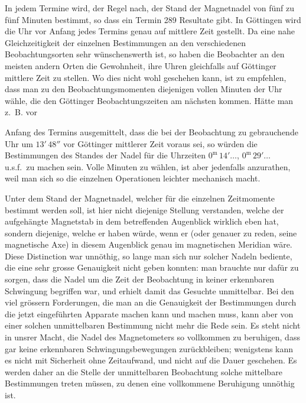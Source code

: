 \documentclass[12pt,a4paper]{article}
\begin{document}
In jedem Termine wird, der Regel nach, der Stand der Magnetnadel von f\"unf zu f\"unf Minuten bestimmt, so dass ein Termin 289 Resultate gibt. In G\"ottingen wird die Uhr vor Anfang jedes Termins genau auf mittlere Zeit gestellt. Da eine nahe Gleichzeitigkeit der einzelnen Bestimmungen an den verschiedenen Beobachtungsorten sehr w\"unschenswerth ist, so haben die Beobachter an den meisten andern Orten die Gewohnheit, ihre Uhren gleichfalls auf G\"ottinger mittlere Zeit zu stellen. Wo dies nicht wohl geschehen kann, ist zu empfehlen, dass man zu den Beobachtungsmomenten diejenigen vollen Minuten der Uhr w\"ahle, die den G\"ottinger Beobachtungszeiten am n\"achsten kommen. H\"atte man z.~B. vor

\newpage
\noindent
Anfang des Termins ausgemittelt, dass die bei der Beobachtung zu gebrauchende Uhr um $13'\,48''$ vor G\"ottinger mittlerer Zeit voraus sei, so w\"urden die Bestimmungen des Standes der Nadel f\"ur die Uhrzeiten $0^{\text{m}}\,14'\ldots$, $0^{\text{m}}\,29'\ldots$ u.s.f.\ zu machen sein. Volle Minuten zu w\"ahlen, ist aber jedenfalls anzurathen, weil man sich so die einzelnen Operationen leichter mechanisch macht.

Unter dem Stand der Magnetnadel, welcher f\"ur die einzelnen Zeitmomente bestimmt werden soll, ist hier nicht diejenige Stellung verstanden, welche der aufgeh\"angte Magnetstab in dem betreffenden Augenblick wirklich eben hat, sondern diejenige, welche er haben w\"urde, wenn er (oder genauer zu reden, seine magnetische Axe) in diesem Augenblick genau im magnetischen Meridian w\"are. Diese Distinction war unn\"othig, so lange man sich nur solcher Nadeln bediente, die eine sehr grosse Genauigkeit nicht geben konnten: man brauchte nur daf\"ur zu sorgen, dass die Nadel um die Zeit der Beobachtung in keiner erkennbaren Schwingung begriffen war, und erhielt damit das Gesuchte unmittelbar. Bei den viel gr\"ossern Forderungen, die man an die Genauigkeit der Bestimmungen durch die jetzt eingef\"uhrten Apparate machen kann und machen muss, kann aber von einer solchen unmittelbaren Bestimmung nicht mehr die Rede sein. Es steht nicht in unsrer Macht, die Nadel des Magnetometers so vollkommen zu beruhigen, dass gar keine erkennbaren Schwingungsbewegungen zur\"uckbleiben; wenigstens kann es nicht mit Sicherheit ohne Zeitaufwand, und nicht auf die Dauer geschehen. Es werden daher an die Stelle der unmittelbaren Beobachtung solche mittelbare Bestimmungen treten m\"ussen, zu denen eine vollkommene Beruhigung unn\"othig ist.
\end{document}
